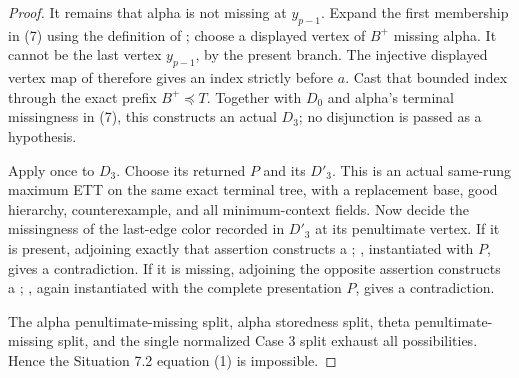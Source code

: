 \begin{proof}
It remains that alpha is not missing at \(y_{p-1}\).  Expand the first
membership in (7) using the definition of
; choose a displayed vertex of \(B^+\) missing
alpha.  It cannot be the last vertex \(y_{p-1}\), by the present branch.
The injective displayed vertex map of  therefore
gives an index strictly before \(a\).  Cast that bounded index through the
exact prefix \(B^+\preccurlyeq T\).  Together with \(D_0\) and alpha's
terminal missingness in (7), this constructs an actual
 \(D_3\); no disjunction is
passed as a hypothesis.

Apply  once to
\(D_3\).  Choose its returned
 \(P\) and its
 \(D'_3\).  This
is an actual same-rung maximum ETT on the same exact terminal tree, with a
replacement base, good hierarchy, counterexample, and all minimum-context
fields.  Now decide the missingness of the last-edge color recorded in
\(D'_3\) at its penultimate vertex.  If it is present, adjoining exactly
that assertion constructs a
;
, instantiated with \(P\),
gives a contradiction.  If it is missing, adjoining the opposite
assertion constructs a
;
, again instantiated with
the complete presentation \(P\), gives a contradiction.

The alpha penultimate-missing split, alpha storedness split, theta
penultimate-missing split, and the single normalized Case 3 split exhaust
all possibilities.  Hence the Situation 7.2 equation (1) is impossible.
\end{proof}
